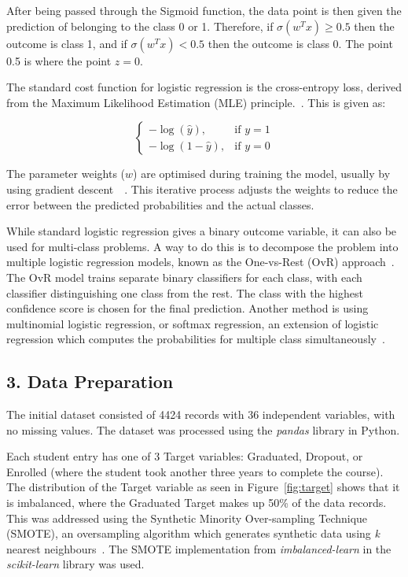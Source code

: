 \documentclass[12pt]{article}
\begin{document}
After being passed through the Sigmoid function, the data point is then given the prediction of belonging to the class 0 or 1. Therefore, if \(\sigma(w^{T}x) \geq 0.5\) then the outcome is class 1, and if \(\sigma(w^{T}x) < 0.5\) then the outcome is class 0. The point 0.5 is where the point \(z = 0\).

The standard cost function for logistic regression is the cross-entropy loss, derived from the Maximum Likelihood Estimation (MLE) principle.~\cite{Bishop2006}. This is given as:

\[
\begin{cases} 
    -\log(\hat{y}), & \text{if } y = 1 \\
    -\log(1 - \hat{y}), & \text{if } y = 0
\end{cases}
\]

 The parameter weights (\(w\)) are optimised during training the model, usually by using gradient descent~\cite{Zou2019}~\cite{Li2024}. This iterative process adjusts the weights to reduce the error between the predicted probabilities and the actual classes.

While standard logistic regression gives a binary outcome variable, it can also be used for multi-class problems. A way to do this is to decompose the problem into multiple logistic regression models, known as the One-vs-Rest (OvR) approach~\cite{Aly2005}. The OvR model trains separate binary classifiers for each class, with each classifier distinguishing one class from the rest. The class with the highest confidence score is chosen for the final prediction. Another method is using multinomial logistic regression, or softmax regression, an extension of logistic regression which computes the probabilities for multiple class simultaneously~\cite{Yin2018}.

\newpage
\subsection*{3. Data Preparation}
The initial dataset consisted of 4424 records with 36 independent variables, with no missing values. The dataset was processed using the \textit{pandas} library in Python.

Each student entry has one of 3 Target variables: Graduated, Dropout, or Enrolled (where the student took another three years to complete the course). The distribution of the Target variable as seen in Figure~\ref{fig:target} shows that it is imbalanced, where the Graduated Target makes up 50\% of the data records. This was addressed using the Synthetic Minority Over-sampling Technique (SMOTE), an oversampling algorithm which generates synthetic data using \textit{k} nearest neighbours~\cite{smote}. The SMOTE implementation from \textit{imbalanced-learn} in the \textit{scikit-learn} library was used.
\end{document}
